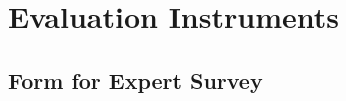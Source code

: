 \chapter{Evaluation Instruments} 
\label{ap:measurement-instruments}


\def \tick{
$[$\hspace{0.3cm}$]$
}

\def \twooption#1#2{
\tick #1.  \tick #2.
}

\def \threeoption#1#2#3{
\tick #1.\newline
\tick #2.\newline
\tick #3.
}

\def \fouroption#1#2#3#4{
\tick #1.\newline
\tick #2.\newline
\tick #3.\newline
\tick #4.
}

\def \fiveoption#1#2#3#4#5{
\tick #1.\newline
\tick #2.\newline
\tick #3.\newline
\tick #4.\newline
\tick #5.
}
\def \datefield{
    /\hspace{0.4cm}/
}

\def \rcolor{
    \rowcolor[gray]{0.9}
}

\def \hcolor{
    \rowcolor[gray]{0.7}
}


\section{Form for Expert Survey}
\label{ap:sec:feedback}

